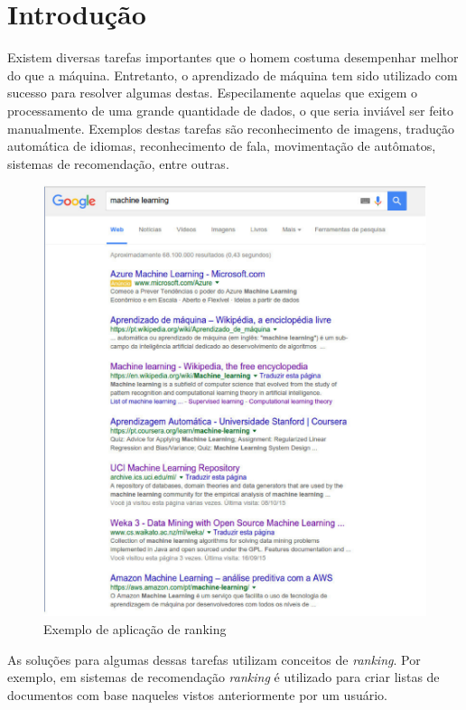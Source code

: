 \chapter{Introdução}

Existem diversas tarefas importantes que o homem costuma desempenhar melhor do que a máquina.
Entretanto, o aprendizado de máquina tem sido utilizado com sucesso para resolver algumas destas.
Especilamente aquelas que exigem o processamento de uma grande quantidade de dados, o que seria inviável ser feito manualmente.
Exemplos destas tarefas são reconhecimento de imagens, tradução automática de idiomas, reconhecimento de fala, movimentação de autômatos, sistemas de recomendação, entre outras.

\begin{figure}[h!]
  \includegraphics[width=\linewidth]{images/intro01.eps}
  \caption{Exemplo de aplicação de ranking}
  \label{fig:metodoproposto01}
\end{figure}

As soluções para algumas dessas tarefas utilizam conceitos de \textit{ranking}.
Por exemplo, em sistemas de recomendação \textit{ranking} é utilizado para criar listas de documentos com base naqueles vistos anteriormente por um usuário.

